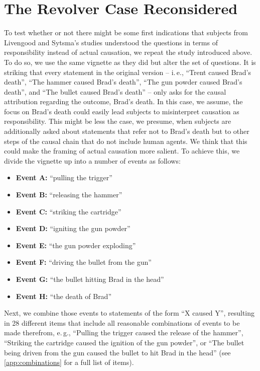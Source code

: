 \documentclass[12pt]{scrartcl}
\begin{document}
\section{The Revolver Case Reconsidered}
To test whether or not there might be some first indications that subjects from Livengood and Sytsma's studies understood the questions in terms of responsibility instead of actual causation, we repeat the study introduced above. To do so, we use the same vignette as they did but alter the set of questions. It is striking that every statement in the original version -- i.\,e., \enquote{Trent caused Brad's death}, \enquote{The hammer caused Brad's death}, \enquote{The gun powder caused Brad's death}, and \enquote{The bullet caused Brad's death} -- only asks for the causal attribution regarding the outcome, Brad's death. In this case, we assume, the focus on Brad's death could easily lead subjects to misinterpret causation as responsibility. This might be less the case, we presume, when subjects are additionally asked about statements that refer not to Brad's death but to other steps of the causal chain that do not include human agents. We think that this could make the framing of actual causation more salient. To achieve this, we divide the vignette up into a number of events as follows:
%
\begin{itemize}
   \item\textbf{\textsf{Event A:}} \enquote{pulling the trigger}
   \item\textbf{\textsf{Event B:}} \enquote{releasing the hammer}
   \item\textbf{\textsf{Event C:}} \enquote{striking the cartridge}
   \item\textbf{\textsf{Event D:}} \enquote{igniting the gun powder}
   \item\textbf{\textsf{Event E:}} \enquote{the gun powder exploding}
   \item\textbf{\textsf{Event F:}} \enquote{driving the bullet from the gun}
   \item\textbf{\textsf{Event G:}} \enquote{the bullet hitting Brad in the head}
   \item\textbf{\textsf{Event H:}} \enquote{the death of Brad}
\end{itemize}
%
Next, we combine those events to statements of the form \enquote{X caused Y}, resulting in 28 different items that include all reasonable combinations of events to be made therefrom, e.\,g., \enquote{Pulling the trigger caused the release of the hammer}, \enquote{Striking the cartridge caused the ignition of the gun powder}, or \enquote{The bullet being driven from the gun caused the bullet to hit Brad in the head} (see \autoref{app:combinations} for a full list of items).
\end{document}
